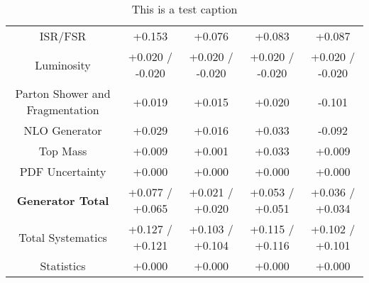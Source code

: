 \begin{table}[htbp]
\begin{center}
\begin{tabular}{|c|c|c|c|c|}
ISR/FSR                               &+0.153              & +0.076              & +0.083              & +0.087             \\
Luminosity                            &+0.020   / -0.020   & +0.020   / -0.020   & +0.020   / -0.020   & +0.020   / -0.020  \\
Parton Shower and Fragmentation       &+0.019              & +0.015              & +0.020              & -0.101             \\
NLO Generator                         &+0.029              & +0.016              & +0.033              & -0.092             \\
Top Mass                              &+0.009              & +0.001              & +0.033              & +0.009             \\
PDF Uncertainty                       &+0.000              & +0.000              & +0.000              & +0.000             \\
\hline
\textbf{Generator Total}              &+0.077   / +0.065   & +0.021   / +0.020   & +0.053   / +0.051   & +0.036   / +0.034  \\
\hline
\hline
Total Systematics                     &+0.127   / +0.121   & +0.103   / +0.104   & +0.115   / +0.116   & +0.102   / +0.101  \\
Statistics                            &+0.000              & +0.000              & +0.000              & +0.000             \\
\hline
  \end{tabular}
  \end{center} 
  \label{tab:xsec_nominal_coscos_op}
  \caption{This is a test caption}
\end{table}
 
 


\clearpage

